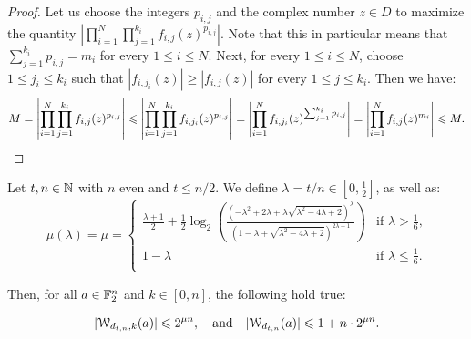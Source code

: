 \documentclass[11pt]{llncs}
\begin{document}
\begin{proof}
    Let us choose the integers $p_{i,j}$ and the complex number $z\in D$ to maximize the quantity $\left|\prod_{i=1}^N\prod_{j=1}^{k_i}f_{i,j}(z)^{p_{i,j}}\right|$. Note that this in particular means that $\sum_{j=1}^{k_i}p_{i,j}=m_i$ for every $1\leq i\leq N$. Next, for every $1\leq i\leq N$, choose $1\leq j_i\leq k_i$ such that $|f_{i,j_i}(z)|\geq|f_{i,j}(z)|$ for every $1\leq j\leq k_i$. Then we have:
    \[
        M=\left|\prod_{i=1}^N\prod_{j=1}^{k_i}f_{i,j}(z)^{p_{i,j}}\right|\leq\left|\prod_{i=1}^N\prod_{j=1}^{k_i}f_{i,j_i}(z)^{p_{i,j}}\right|=\left|\prod_{i=1}^Nf_{i,j_i}(z)^{\sum_{j=1}^{k_i}p_{i,j}}\right|=\left|\prod_{i=1}^Nf_{i,j}(z)^{m_i}\right|\leq M.\qedhere
    \]
\end{proof}

\begin{theorem}\label{theorem:bound_D_nka_generalized}
    Let $t, n\in \N$ with $n$ even and $t\le n/2$. 
    We define $\lambda=t/n\in\left[0,\frac 12\right]$, as well as:
    \[
        \mu(\lambda)=\mu=
        \begin{cases}
            \frac{\lambda+1}{2}+\frac12\log_2\left(\frac{\left(-\lambda^2+2\lambda+\lambda\sqrt{\lambda^2-4\lambda+2}\right)^\lambda}{\left(1-\lambda+\sqrt{\lambda^2-4\lambda+2}\right)^{2\lambda-1}}\right)&\text{if $\lambda>\frac 16$,}\\
            1-\lambda&\text{if $\lambda\leq\frac 16$.}\\
        \end{cases}
    \]

    Then, for all $a\in\F_2^n$ and $k\in[0,n]$, the following hold true:

    \[
        |\wtk{d_{t,n}}{k}(a)|\leq 2^{\mu n},\quad \text{and} \quad  |\wt{d_{t,n}}(a)|\leq 1+n\cdot 2^{\mu n}.
    \]
\end{theorem}
\end{document}
